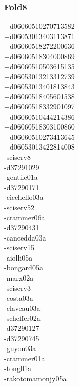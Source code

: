 \begin{multicols}{3}
\subsubsection*{Fold8}
+d06060510270713582\\
+d06053013403113871\\
+d06060518272200636\\
+d06060518304000869\\
+d06060510503615135\\
+d06053013213312739\\
+d06053013401813843\\
+d06060518405601538\\
+d06060518332901097\\
+d06060510444214386\\
+d06060518303100860\\
+d06060510273413645\\
+d06053013422814008\\
-sciserv8\\
-d37291029\\
-gentile01a\\
-d37290171\\
-cicchello03a\\
-sciserv52\\
-crammer06a\\
-d37290431\\
-cancedda03a\\
-sciserv15\\
-aiolli05a\\
-bongard05a\\
-marx02a\\
-sciserv3\\
-costa03a\\
-claveau03a\\
-scheffer02a\\
-d37290127\\
-d37290745\\
-guyon03a\\
-crammer01a\\
-tong01a\\
-rakotomamonjy05a\\

\end{multicols}
